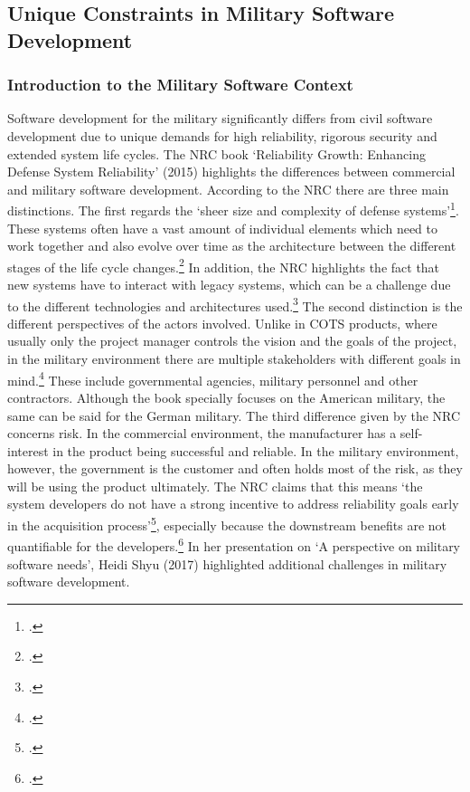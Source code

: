 \subsection{Unique Constraints in Military Software Development}
\subsubsection{Introduction to the Military Software Context}
Software development for the military significantly differs from civil software development due to unique demands for high reliability, rigorous security and extended system life cycles.
The \ac{NRC} book `Reliability Growth: Enhancing Defense System Reliability' (2015) highlights the differences between commercial and military software development.
According to the NRC there are three main distinctions. The first regards the `sheer size and complexity of defense systems'\footcite[31]{nrc2015defense}.
These systems often have a vast amount of individual elements which need to work together and also evolve over time as the architecture  between the different stages of 
the life cycle changes.\footcite[32]{nrc2015defense} In addition, the \ac{NRC} highlights the fact that new systems have to interact with legacy systems, which can be a challenge
due to the different technologies and architectures used.\footcite[32]{nrc2015defense}
The second distinction is the different perspectives of the actors involved. Unlike in \ac{COTS} products, where usually only the project manager 
controls the vision and the goals of the project, in the military environment there are multiple stakeholders with different goals in mind.\footcite[32]{nrc2015defense}
These include governmental agencies, military personnel and other contractors.
Although the book specially focuses on the American military, the same can be said for the German military.
The third difference given by the NRC concerns risk. In the commercial environment, the manufacturer has a self-interest in the product being successful and reliable.
In the military environment, however, the government is the customer and often holds most of the risk, as they will be using the product ultimately.
The NRC claims that this means `the system developers do not have a strong incentive to address reliability goals early in the acquisition process'\footcite[33]{nrc2015defense},
especially because the downstream benefits are not quantifiable for the developers.\footcite[33]{nrc2015defense}
In her presentation on `A perspective on military software needs', Heidi Shyu (2017) highlighted additional challenges in military software development.
